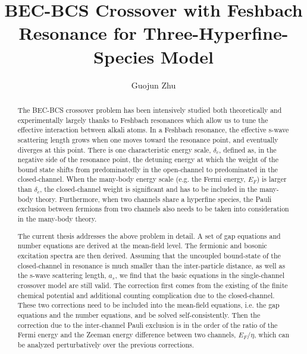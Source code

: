 \documentclass[edeposit,fullpage,prequest,10pt]{uiucthesis2009}
\begin{document}
\title{BEC-BCS Crossover with Feshbach Resonance for Three-Hyperfine-Species Model}
\author{Guojun Zhu}
\phdthesis
{}
\maketitle

\frontmatter

%
\begin{abstract}
The BEC-BCS crossover problem has been intensively studied both theoretically and experimentally largely thanks to  Feshbach resonances which allow us to tune the effective interaction between alkali atoms.  In a Feshbach resonance, the effective s-wave scattering length grows when one moves toward the resonance point, and eventually diverges at this point.  There is one characteristic energy scale, $\delta_c$, defined as, in the negative side of the resonance point, the detuning energy at which the weight of the bound state shifts from predominatedly in the open-channel to predominated in the closed-channel.  When the many-body energy scale (e.g. the Fermi energy, $E_{F}$) is larger than $\delta_c$, the closed-channel weight is significant and has to be included in the many-body theory.  Furthermore, when two channels share a hyperfine species, the Pauli exclusion between fermions from two channels also needs to be taken into consideration in the many-body theory.  

The current  thesis addresses the above problem in detail. A set of gap equations and number equations  are derived at the mean-field level.  The fermionic and bosonic excitation spectra are then derived. Assuming that the uncoupled bound-state of the closed-channel in resonance is much smaller than the inter-particle distance, as well as the s-wave scattering length, $a_s$, we find that  the basic equations in the single-channel crossover model are still valid. The correction first comes from the existing of the finite chemical potential and additional counting complication due to the closed-channel.  These two corrections need to be included into the mean-field equations, i.e. the gap equations and the number equations, and be solved self-consistently.  Then the correction due to the inter-channel Pauli exclusion is in the  order of the ratio of the Fermi energy and the Zeeman energy difference between two channels, $E_F/\eta$, which can be analyzed perturbatively over the previous corrections.  
\end{abstract}
\end{document}
